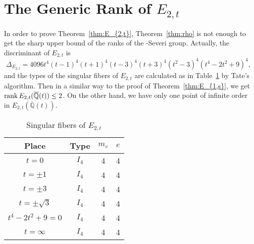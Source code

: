 \documentclass[main]{subfiles}
\begin{document}
\section{The Generic Rank of \texorpdfstring{$E_{2,t}$}{E2,t}}

In order to prove Theorem~\ref{thm:E_{2,t}}, Theorem~\ref{thm:rho} is not enough to get the sharp upper bound of the ranks of the \Neron-Severi group.
Actually, the discriminant of $E_{2,t}$ is
\begin{equation*}
    \Delta_{E_{2,t}} = 4096t^{4}(t - 1)^{4}(t + 1)^{4}(t - 3)^{4}(t + 3)^{4}(t^{2} - 3)^{4}(t^{4} - 2t^{2} + 9)^{4},
\end{equation*}
and the types of the singular fibers of $E_{2,t}$ are calculated as in Table~\ref{tab:E_{2,t}} by Tate's algorithm.
Then in a similar way to the proof of Theorem~\ref{thm:E_{1,s}}, we get $\operatorname{rank} E_{2,t}(\overline{\mathbb{Q}}(t)) \leq 2$.
On the other hand, we have only one point of infinite order in $E_{2,t}(\overline{\mathbb{Q}}(t))$.
\begin{table}[H]
    \centering
    \caption{Singular fibers of $E_{2,t}$}
    \begin{tabular}{|c|c|c|c|}
        \hline
        Place            & Type  & $m_v$ & $e$ \\
        \hline
        $t=0$            & $I_4$ & 4     & 4   \\
        $t=\pm 1$        & $I_4$ & 4     & 4   \\
        $t=\pm 3$        & $I_4$ & 4     & 4   \\
        $t=\pm \sqrt{3}$ & $I_4$ & 4     & 4   \\
        $t^4-2t^2+9=0$   & $I_4$ & 4     & 4   \\
        $t=\infty$       & $I_4$ & 4     & 4   \\
        \hline
    \end{tabular}
    \label{tab:E_{2,t}}
\end{table}
\end{document}
